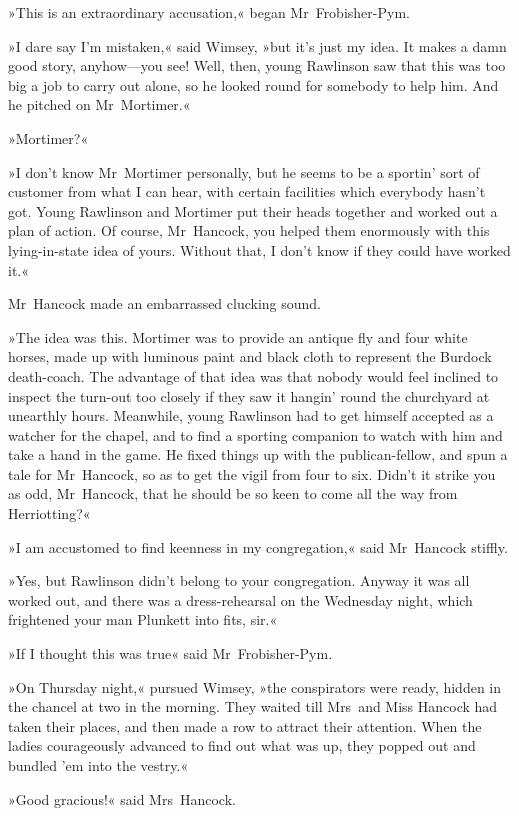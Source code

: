 »This is an extraordinary accusation,« began Mr~Frobisher-Pym.

»I dare say I'm mistaken,« said Wimsey, »but it's just my idea. It makes a damn good story, anyhow—you see! Well, then, young Rawlinson saw that this was too big a job to carry out alone, so he looked round for somebody to help him. And he pitched on Mr~Mortimer.«

»Mortimer?«

»I don't know Mr~Mortimer personally, but he seems to be a sportin' sort of customer from what I can hear, with certain facilities which everybody hasn't got. Young Rawlinson and Mortimer put their heads together and worked out a plan of action. Of course, Mr~Hancock, you helped them enormously with this lying-in-state idea of yours. Without that, I don't know if they could have worked it.«

Mr~Hancock made an embarrassed clucking sound.

»The idea was this. Mortimer was to provide an antique fly and four white horses, made up with luminous paint and black cloth to represent the Burdock death-coach. The advantage of that idea was that nobody would feel inclined to inspect the turn-out too closely if they saw it hangin' round the churchyard at unearthly hours. Meanwhile, young Rawlinson had to get himself accepted as a watcher for the chapel, and to find a sporting companion to watch with him and take a hand in the game. He fixed things up with the publican-fellow, and spun a tale for Mr~Hancock, so as to get the vigil from four to six. Didn't it strike you as odd, Mr~Hancock, that he should be so keen to come all the way from Herriotting?«

»I am accustomed to find keenness in my congregation,« said Mr~Hancock stiffly.

»Yes, but Rawlinson didn't belong to your congregation. Anyway it was all worked out, and there was a dress-rehearsal on the Wednesday night, which frightened your man Plunkett into fits, sir.«

»If I thought this was true\longdash« said Mr~Frobisher-Pym.

»On Thursday night,« pursued Wimsey, »the conspirators were ready, hidden in the chancel at two in the morning. They waited till Mrs~and Miss Hancock had taken their places, and then made a row to attract their attention. When the ladies courageously advanced to find out what was up, they popped out and bundled 'em into the vestry.«

»Good gracious!« said Mrs~Hancock.

